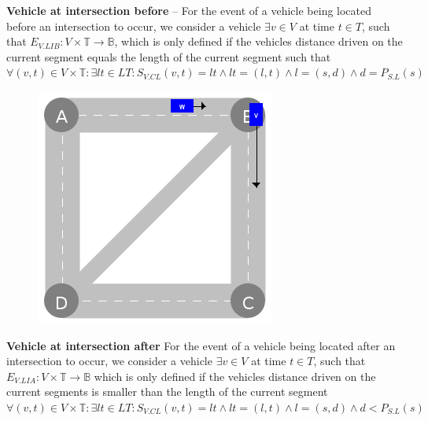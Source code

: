 \documentclass[graybox]{svmult}
\begin{document}
\noindent
\textbf{Vehicle at intersection before}
--
For the event of a vehicle being located before an intersection to occur, we consider a vehicle $\exists v \in V$ at time $t \in T$, such that $E_{V.LIB}: V \times \mathbb{T} \rightarrow \mathbb{B}$, which is only defined if the vehicles distance driven on the current segment equals the length of the current segment such that $\forall (v,t) \in V \times \mathbb{T}: \exists lt \in LT: S_{V.CL}(v,t) = lt \wedge lt = (l, t) \wedge l = (s, d) \wedge d = P_{S.L}(s)$
\vspace{4mm}
\begin{figure}
	\centering
		\includegraphics[scale=0.35]{../../events/vehicle-at-intersection-after.png}
\end{figure}

\noindent
\textbf{Vehicle at intersection after}
For the event of a vehicle being located after an intersection to occur, we consider a vehicle $\exists v \in V$ at time $t \in T$, such that $E_{V.LIA}: V \times \mathbb{T} \rightarrow \mathbb{B}$ which is only defined if the vehicles distance driven on the current segments is smaller than the length of the current segment $\forall (v,t) \in V \times \mathbb{T}: \exists lt \in LT: S_{V.CL}(v,t) = lt \wedge lt = (l, t) \wedge l = (s, d) \wedge d < P_{S.L}(s)$

\vspace{4mm}
\end{document}
